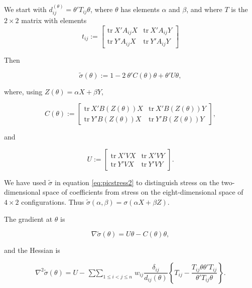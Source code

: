 \documentclass[
  12pt,
]{book}
\theoremstyle{definition}
\theoremstyle{definition}
\theoremstyle{definition}
\theoremstyle{definition}
\theoremstyle{remark}
\begin{document}
We start with \(d_{ij}^(\theta)=\theta'T_{ij}\theta\), where \(\theta\) has
elements \(\alpha\) and \(\beta\), and where \(T\) is the \(2\times 2\) matrix
with elements \begin{equation}
t_{ij}:=\begin{bmatrix}
\text{tr}\ X'A_{ij}X&\text{tr}\ X'A_{ij}Y\\
\text{tr}\ Y'A_{ij}X&\text{tr}\ Y'A_{ij}Y
\end{bmatrix}
\label{eq:pictbform}
\end{equation}

Then

\begin{equation}
\tilde\sigma(\theta):=1-2\ \theta'C(\theta)\theta+\theta'U\theta,
\label{eq:picstress2}
\end{equation}

where, using \(Z(\theta)=\alpha X+\beta Y\),

\begin{equation}
C(\theta):=
\begin{bmatrix}
\text{tr}\ X'B(Z(\theta))X&\text{tr}\ X'B(Z(\theta))Y\\
\text{tr}\ Y'B(Z(\theta))X&\text{tr}\ Y'B(Z(\theta))Y
\end{bmatrix},
\label{eq:pictbformc}
\end{equation}

and

\begin{equation}
U:=\begin{bmatrix}
\text{tr}\ X'VX&\text{tr}\ X'VY\\
\text{tr}\ Y'VX&\text{tr}\ Y'VY
\end{bmatrix}.
\label{eq:pictbformu}
\end{equation}

We have used \(\tilde\sigma\) in equation \eqref{eq:picstress2} to
distinguish stress on the two-dimensional space of coefficients from
stress on the eight-dimensional space of \(4\times 2\) configurations.
Thus \(\tilde\sigma(\alpha,\beta)=\sigma(\alpha X + \beta Z)\).

The gradient at \(\theta\) is

\begin{equation}
\nabla\tilde\sigma(\theta)=U\theta-C(\theta)\theta,
\label{eq:picgrad2}
\end{equation}

and the Hessian is

\begin{equation}
\nabla^2\tilde\sigma(\theta)=U-\mathop{\sum\sum}_{1\leq i<j\leq n}
w_{ij}\frac{\delta_{ij}}{d_{ij}(\theta)}\left\{T_{ij}-\frac{T_{ij}\theta\theta'T_{ij}}{\theta'T_{ij}\theta}\right\}.
\label{eq:pichess2}
\end{equation}
\end{document}
